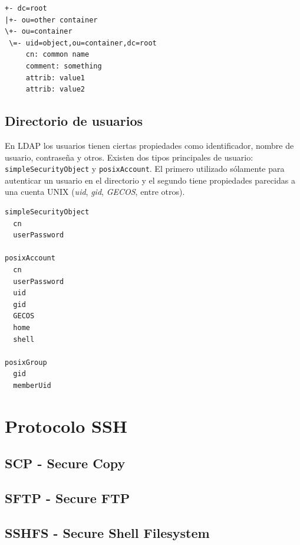 
{
\scriptsize
\linespread{1}
\begin{verbatim}
+- dc=root
|+- ou=other container
\+- ou=container
 \=- uid=object,ou=container,dc=root
     cn: common name
     comment: something
     attrib: value1
     attrib: value2
\end{verbatim}
}

  \subsection {Directorio de usuarios}

En LDAP  los usuarios tienen ciertas propiedades como identificador, nombre de usuario, contrase\~{n}a y otros. Existen dos tipos principales de usuario: \verb/simpleSecurityObject/ y \verb/posixAccount/. El primero utilizado s\'{o}lamente para autenticar un usuario en el directorio y el segundo tiene propiedades parecidas a una cuenta UNIX (\textit{uid}, \textit{gid}, \textit{GECOS}, entre otros).

{
\scriptsize
\linespread{1}
\begin{verbatim}
simpleSecurityObject
  cn
  userPassword

posixAccount
  cn
  userPassword
  uid
  gid
  GECOS
  home
  shell

posixGroup
  gid
  memberUid
\end{verbatim}
}


\section {Protocolo SSH}
  \subsection {SCP - Secure Copy}
  \subsection {SFTP - Secure FTP}
  \subsection {SSHFS - Secure Shell Filesystem}
